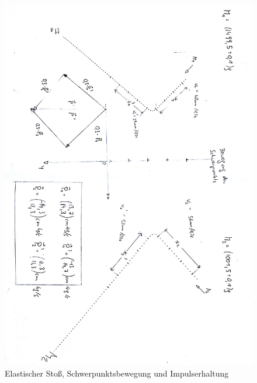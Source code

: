 \documentclass[12pt,a4paper]{article}
\begin{document}
\begin{figure}[H]
	\centering
	\includegraphics[scale=0.9]{./figure/elastischer_stoss.png}
	\caption{Elastischer Stoß, Schwerpunktsbewegung und Impulserhaltung}
	\label{fig:elastisch_stoss}
\end{figure}
\end{document}
